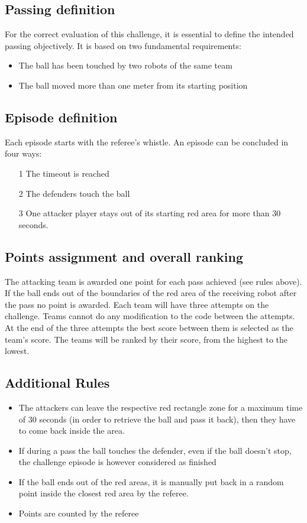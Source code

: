 \subsection{Passing definition}
For the correct evaluation of this challenge, it is essential to define the intended passing objectively. It is based on two fundamental requirements:
\begin{itemize}
    \item The ball has been touched by two robots of the same team
    \item The ball moved more than one meter from its starting position
\end{itemize}


\subsection{Episode definition}
Each episode starts with the referee's whistle. An episode can be concluded in four ways: 
\begin{itemize}
    \item[1] The timeout is reached
    \item[2] The defenders touch the ball
    \item[3] One attacker player stays out of its starting red area for more than 30 seconds.

\end{itemize}

\subsection{Points assignment and overall ranking}
The attacking team is awarded one point for each pass achieved (see rules above). If the ball ends out of the boundaries of the red area of the receiving robot after the pass no point is awarded. Each team will have three attempts on the challenge. Teams cannot do any modification to the code between the attempts. At the end of the three attempts the best score between them is selected as the team's score. The teams will be ranked by their score, from the highest to the lowest. 

\subsection{Additional Rules}
\begin{itemize}
    \item The attackers can leave the respective red rectangle zone for a maximum time of 30 seconds (in order to retrieve the ball and pass it back), then they have to come back inside the area.
    \item If during a pass the ball touches the defender, even if the ball doesn't stop, the challenge episode is however considered as finished
    \item If the ball ends out of the red areas, it is manually put back in a random point inside the closest red area by the referee.
    \item Points are counted by the referee
    
\end{itemize}
